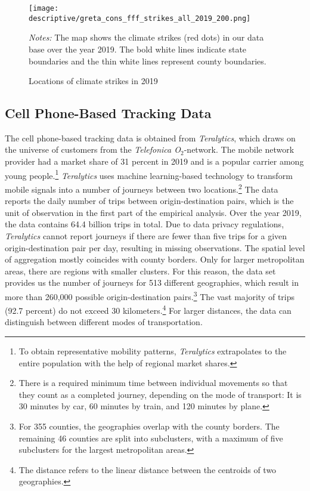 \begin{figure}[t]\centering
	\texttt{[image: descriptive/greta\_cons\_fff\_strikes\_all\_2019\_200.png]}
	\begin{minipage}{0.9\linewidth}
		\caption{Locations of climate strikes in 2019}\label{fig_greta_cons:fff_strikes_2019}
		\scriptsize{\emph{Notes:} The map shows the climate strikes (red dots) in our data base over the year 2019. The bold white lines indicate state boundaries and the thin white lines represent county boundaries.}
	\end{minipage}
\end{figure}


\subsection{Cell Phone-Based Tracking Data}
The cell phone-based tracking data is obtained from \textit{Teralytics}, which draws on the universe of customers from the \textit{Telefonica O$_2$}-network. The mobile network provider had a market share of 31 percent in 2019 \citep{statista2020marktanteil} and is a popular carrier among young people.\footnote{To obtain representative mobility patterns, \textit{Teralytics} extrapolates to the entire population with the help of regional market shares.} \textit{Teralytics} uses machine learning-based technology to transform mobile signals into a number of journeys between two locations.\footnote{There is a required minimum time between individual movements so that they count as a completed journey, depending on the mode of transport: It is 30 minutes by car, 60 minutes by train, and 120 minutes by plane.} The data reports the daily number of trips between origin-destination pairs, which is the unit of observation in the first part of the empirical analysis. Over the year 2019, the data contains 64.4 billion trips in total. Due to data privacy regulations, \textit{Teralytics} cannot report journeys if there are fewer than five trips for a given origin-destination pair per day, resulting in missing observations. The spatial level of aggregation mostly coincides with county borders. Only for larger metropolitan areas, there are regions with smaller clusters. For this reason, the data set provides us the number of journeys for 513 different geographies, which result in more than 260,000 possible origin-destination pairs.\footnote{For 355 counties, the geographies overlap with the county borders. The remaining 46 counties are split into subclusters, with a maximum of five subclusters for the largest metropolitan areas.} The vast majority of trips (92.7 percent) do not exceed 30 kilometers.\footnote{The distance refers to the linear distance between the centroids of two geographies.} For larger distances, the data can distinguish between different modes of transportation.




